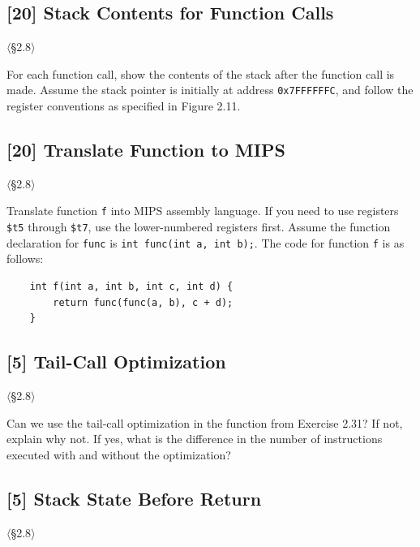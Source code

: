 \subsection{[20] Stack Contents for Function Calls}
\hypertarget{prob-2.30}{}
\noindent$\langle$\S2.8$\rangle$\medskip

\noindent For each function call, show the contents of the stack after the
function call is made. Assume the stack pointer is initially at address
\texttt{0x7FFFFFFC}, and follow the register conventions as specified in
Figure 2.11.

\problembreak

\subsection{[20] Translate Function to MIPS}
\hypertarget{prob-2.31}{}
\noindent$\langle$\S2.8$\rangle$\medskip

\noindent Translate function \texttt{f} into MIPS assembly language. If you
need to use registers \texttt{\$t5} through \texttt{\$t7}, use the
lower-numbered registers first. Assume the function declaration for
\texttt{func} is \texttt{int func(int a, int b);}. The code for function
\texttt{f} is as follows:
\begin{verbatim}
    int f(int a, int b, int c, int d) {
        return func(func(a, b), c + d);
    }
\end{verbatim}

\problembreak

\subsection{[5] Tail-Call Optimization}
\hypertarget{prob-2.32}{}
\noindent$\langle$\S2.8$\rangle$\medskip

\noindent Can we use the tail-call optimization in the function from Exercise
2.31? If not, explain why not. If yes, what is the difference in the number of
instructions executed with and without the optimization?

\problembreak

\subsection{[5] Stack State Before Return}
\hypertarget{prob-2.33}{}
\noindent$\langle$\S2.8$\rangle$\medskip

